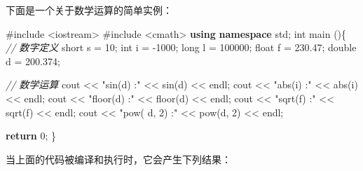 \documentclass[
]{article}
\newenvironment{Shaded}{}{}
\newcommand{\CommentTok}[1]{\textcolor[rgb]{0.38,0.63,0.69}{\textit{#1}}}
\newcommand{\ControlFlowTok}[1]{\textcolor[rgb]{0.00,0.44,0.13}{\textbf{#1}}}
\newcommand{\DataTypeTok}[1]{\textcolor[rgb]{0.56,0.13,0.00}{#1}}
\newcommand{\DecValTok}[1]{\textcolor[rgb]{0.25,0.63,0.44}{#1}}
\newcommand{\FloatTok}[1]{\textcolor[rgb]{0.25,0.63,0.44}{#1}}
\newcommand{\ImportTok}[1]{#1}
\newcommand{\KeywordTok}[1]{\textcolor[rgb]{0.00,0.44,0.13}{\textbf{#1}}}
\newcommand{\NormalTok}[1]{#1}
\newcommand{\OperatorTok}[1]{\textcolor[rgb]{0.40,0.40,0.40}{#1}}
\newcommand{\PreprocessorTok}[1]{\textcolor[rgb]{0.74,0.48,0.00}{#1}}
\newcommand{\StringTok}[1]{\textcolor[rgb]{0.25,0.44,0.63}{#1}}
\begin{document}
下面是一个关于数学运算的简单实例：

\begin{Shaded}
\begin{Highlighting}[]
\PreprocessorTok{\#include }\ImportTok{\textless{}iostream\textgreater{}}
\PreprocessorTok{\#include }\ImportTok{\textless{}cmath\textgreater{}}
\KeywordTok{using} \KeywordTok{namespace}\NormalTok{ std}\OperatorTok{;}
\DataTypeTok{int}\NormalTok{ main }\OperatorTok{()\{}
   \CommentTok{// 数字定义}
   \DataTypeTok{short}\NormalTok{  s }\OperatorTok{=} \DecValTok{10}\OperatorTok{;}
   \DataTypeTok{int}\NormalTok{    i }\OperatorTok{=} \OperatorTok{{-}}\DecValTok{1000}\OperatorTok{;}
   \DataTypeTok{long}\NormalTok{   l }\OperatorTok{=} \DecValTok{100000}\OperatorTok{;}
   \DataTypeTok{float}\NormalTok{  f }\OperatorTok{=} \FloatTok{230.47}\OperatorTok{;}
   \DataTypeTok{double}\NormalTok{ d }\OperatorTok{=} \FloatTok{200.374}\OperatorTok{;}

   \CommentTok{// 数学运算}
\NormalTok{   cout }\OperatorTok{\textless{}\textless{}} \StringTok{"sin(d) :"} \OperatorTok{\textless{}\textless{}}\NormalTok{ sin}\OperatorTok{(}\NormalTok{d}\OperatorTok{)} \OperatorTok{\textless{}\textless{}}\NormalTok{ endl}\OperatorTok{;}
\NormalTok{   cout }\OperatorTok{\textless{}\textless{}} \StringTok{"abs(i)  :"} \OperatorTok{\textless{}\textless{}}\NormalTok{ abs}\OperatorTok{(}\NormalTok{i}\OperatorTok{)} \OperatorTok{\textless{}\textless{}}\NormalTok{ endl}\OperatorTok{;}
\NormalTok{   cout }\OperatorTok{\textless{}\textless{}} \StringTok{"floor(d) :"} \OperatorTok{\textless{}\textless{}}\NormalTok{ floor}\OperatorTok{(}\NormalTok{d}\OperatorTok{)} \OperatorTok{\textless{}\textless{}}\NormalTok{ endl}\OperatorTok{;}
\NormalTok{   cout }\OperatorTok{\textless{}\textless{}} \StringTok{"sqrt(f) :"} \OperatorTok{\textless{}\textless{}}\NormalTok{ sqrt}\OperatorTok{(}\NormalTok{f}\OperatorTok{)} \OperatorTok{\textless{}\textless{}}\NormalTok{ endl}\OperatorTok{;}
\NormalTok{   cout }\OperatorTok{\textless{}\textless{}} \StringTok{"pow( d, 2) :"} \OperatorTok{\textless{}\textless{}}\NormalTok{ pow}\OperatorTok{(}\NormalTok{d}\OperatorTok{,} \DecValTok{2}\OperatorTok{)} \OperatorTok{\textless{}\textless{}}\NormalTok{ endl}\OperatorTok{;}
 
   \ControlFlowTok{return} \DecValTok{0}\OperatorTok{;}
\OperatorTok{\}}
\end{Highlighting}
\end{Shaded}

当上面的代码被编译和执行时，它会产生下列结果：
\end{document}
